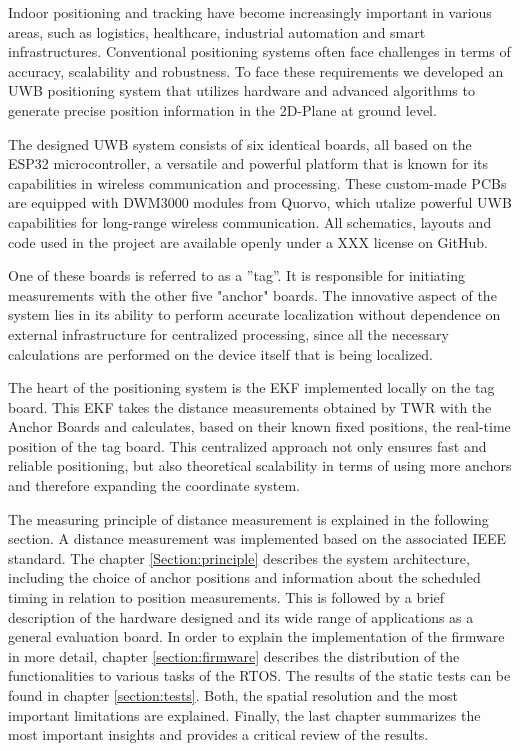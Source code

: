 \documentclass[conference, a4paper]{IEEEtran}
\begin{document}
Indoor positioning and tracking have become increasingly important in various areas,
such as logistics, healthcare, industrial automation and smart infrastructures.
Conventional positioning systems often face challenges in terms of accuracy, scalability and robustness.
To face these requirements we developed an \ac{UWB} positioning system that utilizes
hardware and advanced algorithms to generate precise position information in the 2D-Plane at ground level.

The designed \ac{UWB} system consists of six identical boards,
all based on the ESP32 microcontroller, a versatile and powerful platform that is 
known for its capabilities in wireless communication and processing.
These custom-made \acp{PCB} are equipped with DWM3000 modules from Quorvo,
which utalize powerful UWB capabilities for long-range wireless communication. 
All schematics, layouts and code used in the project are available openly under a XXX license on GitHub. 

One of these boards is referred to as a ''tag''.
It is responsible for initiating measurements with the other five "anchor" boards.
The innovative aspect of the system lies in its ability to perform accurate localization
without dependence on external infrastructure for centralized processing, since all the necessary calculations are performed on the device itself that is being localized.

The heart of the positioning system is the \acf{EKF} implemented locally on the tag board.
This \ac{EKF} takes the distance measurements obtained by \acf{TWR} with the Anchor Boards and calculates, based on their known fixed positions, the real-time position of the tag board.
This centralized approach not only ensures fast and reliable positioning, but also theoretical scalability in terms of using more anchors and therefore expanding the coordinate system. 

The measuring principle of distance measurement is explained in the following section.
A distance measurement was implemented based on the associated IEEE standard.
The chapter \ref{Section:principle} describes the system architecture, including the choice of anchor positions and
information about the scheduled timing in relation to position measurements.
This is followed by a brief description of the hardware designed and
its wide range of applications as a general evaluation board.
In order to explain the implementation of the firmware in more detail,
chapter \ref{section:firmware} describes the distribution of the functionalities to various tasks of the \ac{RTOS}.
The results of the static tests can be found in chapter \ref{section:tests}.
Both, the spatial resolution and the most important limitations are explained.
Finally, the last chapter summarizes the most important insights and provides a critical review of the results.
\end{document}
